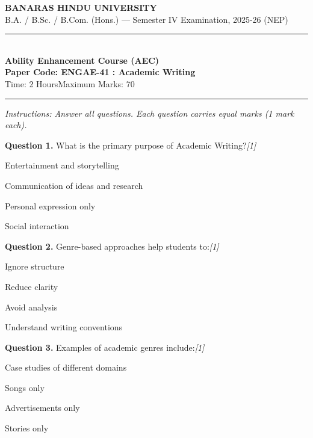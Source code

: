 \documentclass[11pt,a4paper]{article}
\newcommand{\pts}[1]{\hfill   \textit{[#1]}}
\begin{document}
\begin{center}
  {\large\bfseries BANARAS HINDU UNIVERSITY}\\[2pt]
  {\normalsize B.A. / B.Sc. / B.Com. (Hons.) --- Semester IV Examination, 2025-26 (NEP)}\\[6pt]
  \rule{0.8\linewidth}{0.5pt}\\[6pt]
  {\large\bfseries Ability Enhancement Course (AEC)}\\[4pt]
  {\large\bfseries Paper Code: ENGAE-41 : Academic Writing}\\[4pt]
  {\normalsize Time: 2 Hours\hfill Maximum Marks: 70}
\end{center}

\rule{\linewidth}{0.4pt}

\smallskip



\noindent   \textit{Instructions: Answer all questions. Each question carries equal marks (1 mark each).}

\bigskip




\noindent   \textbf{Question 1.} What is the primary purpose of Academic Writing?\pts{1}

\begin{parts}
  \item Entertainment and storytelling
  \item Communication of ideas and research
  \item Personal expression only
  \item Social interaction
\end{parts}

\medskip




\noindent   \textbf{Question 2.} Genre-based approaches help students to:\pts{1}

\begin{parts}
  \item Ignore structure
  \item Reduce clarity
  \item Avoid analysis
  \item Understand writing conventions
\end{parts}

\medskip




\noindent   \textbf{Question 3.} Examples of academic genres include:\pts{1}

\begin{parts}
  \item Case studies of different domains
  \item Songs only
  \item Advertisements only
  \item Stories only
\end{parts}
\end{document}
